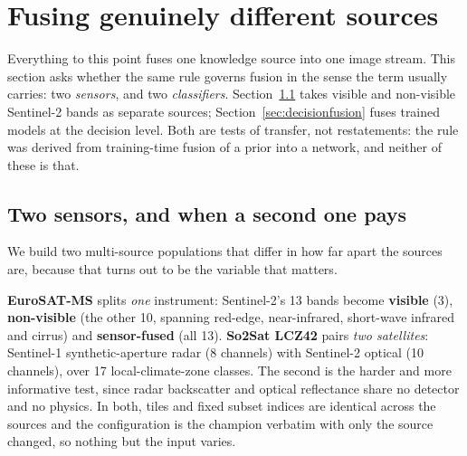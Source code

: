\section{Fusing genuinely different sources}\label{sec:multisource}

Everything to this point fuses one knowledge source into one image stream.
This section asks whether the same rule governs fusion in the sense the
term usually carries: two \emph{sensors}, and two \emph{classifiers}.
Section~\ref{sec:multisensor} takes visible and non-visible Sentinel-2
bands as separate sources; Section~\ref{sec:decisionfusion} fuses trained
models at the decision level. Both are tests of transfer, not restatements: the rule was derived from training-time fusion of a prior
into a network, and neither of these is that.

\subsection{Two sensors, and when a second one pays}\label{sec:multisensor}
We build two multi-source populations that differ in how far apart the
sources are, because that turns out to be the variable that matters.

\textbf{EuroSAT-MS} splits \emph{one} instrument: Sentinel-2's 13 bands
become \textbf{visible} (3), \textbf{non-visible} (the other 10, spanning
red-edge, near-infrared, short-wave infrared and cirrus) and
\textbf{sensor-fused} (all 13). \textbf{So2Sat LCZ42} pairs \emph{two
satellites}: Sentinel-1 synthetic-aperture radar (8 channels) with
Sentinel-2 optical (10 channels), over 17 local-climate-zone classes. The
second is the harder and more informative test, since radar backscatter and
optical reflectance share no detector and no physics. In both, tiles and
fixed subset indices are identical across the sources and the
configuration is the champion verbatim with only the source changed, so
nothing but the input varies.


